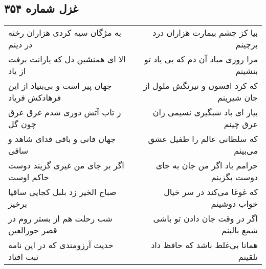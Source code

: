 \begin{center}
\section*{غزل شماره ۳۵۴}
\label{sec:sh354}
\begin{longtable}{l p{0.5cm} r}
به مژگان سیه کردی هزاران رخنه در دینم
&&
بیا کز چشم بیمارت هزاران درد برچینم
\\
الا ای همنشین دل که یارانت برفت از یاد
&&
مرا روزی مباد آن دم که بی یاد تو بنشینم
\\
جهان پیر است و بی‌بنیاد از این فرهادکش فریاد
&&
که کرد افسون و نیرنگش ملول از جان شیرینم
\\
ز تاب آتش دوری شدم غرق عرق چون گل
&&
بیار ای باد شبگیری نسیمی زان عرق چینم
\\
جهان فانی و باقی فدای شاهد و ساقی
&&
که سلطانی عالم را طفیل عشق می‌بینم
\\
اگر بر جای من غیری گزیند دوست حاکم اوست
&&
حرامم باد اگر من جان به جای دوست بگزینم
\\
صباح الخیر زد بلبل کجایی ساقیا برخیز
&&
که غوغا می‌کند در سر خیال خواب دوشینم
\\
شب رحلت هم از بستر روم در قصر حورالعین
&&
اگر در وقت جان دادن تو باشی شمع بالینم
\\
حدیث آرزومندی که در این نامه ثبت افتاد
&&
همانا بی‌غلط باشد که حافظ داد تلقینم
\\
\end{longtable}
\end{center}
